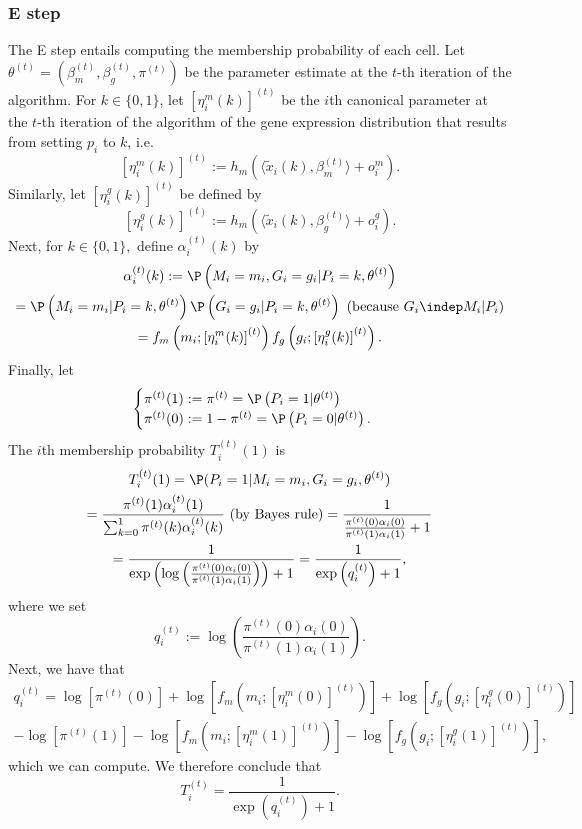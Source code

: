 \documentclass[12pt]{article}
\begin{document}
\begin{appendices}
\subsubsection*{E step}
The E step entails computing the membership probability of each cell. Let $\theta^{(t)} = (\beta_m^{(t)}, \beta_g^{(t)}, \pi^{(t)})$ be the parameter estimate at the $t$-th iteration of the algorithm. For $k \in \{0,1\}$, let $[\eta^m_i(k)]^{(t)}$ be the $i$th canonical parameter at the $t$-th iteration of the algorithm of the gene expression distribution that results from setting $p_i$ to $k$, i.e.
$$
[\eta^m_i(k)]^{(t)} := h_m\left( \langle \tilde{x}_i(k) , \beta_m^{(t)} \rangle + o^m_i \right).
$$ Similarly, let $\left[\eta^g_i(k)\right]^{(t)}$ be defined by
$$\left[\eta^g_i(k)\right]^{(t)} :=  h_m\left( \langle \tilde{x}_i(k) , \beta_g^{(t)} \rangle + o^g_i \right).$$
Next, for $k \in \{0,1\},$ define $\alpha^{(t)}_i(k)$ by
\begin{multline*}
\alpha^{(t)}_i(k) := \P\left( M_i = m_i, G_i = g_i | P_i = k, \theta^{(t)} \right) \\ = \P\left( M_i = m_i | P_i = k, \theta^{(t)} \right) \P\left(G_i = g_i | P_i = k, \theta^{(t)} \right) \textrm{ (because $G_i \indep M_i | P_i$)} \\ = f_m\left(m_i; \left[ \eta^m_i(k) \right]^{(t)}\right) f_g\left(g_i; \left[ \eta^g_i(k) \right]^{(t)} \right).
\end{multline*}
Finally, let 
$$
\begin{cases}
\pi^{(t)}(1) := \pi^{(t)} = \P\left(P_i = 1 | \theta^{(t)} \right) \\
\pi^{(t)}(0) := 1 - \pi^{(t)} = \P\left(P_i = 0 | \theta^{(t)} \right).
\end{cases}
$$
The $i$th membership probability $T^{(t)}_i(1)$ is
\begin{multline*}
T^{(t)}_i(1) = \P(P_i = 1 | M_i = m_i, G_i = g_i, \theta^{(t)}) \\ = \frac{\pi^{(t)}(1) \alpha^{(t)}_i(1)}{ \sum_{k=0}^1 \pi^{(t)}(k) \alpha^{(t)}_i(k)} \textrm{ (by Bayes rule)} = \frac{1}{\frac{ \pi^{(t)}(0) \alpha_i(0)}{\pi^{(t)}(1) \alpha_i(1)} + 1} \\ = \frac{1}{ \exp\left(\log\left(\frac{\pi^{(t)}(0) \alpha_i(0)}{\pi^{(t)}(1) \alpha_i(1)}\right)\right) + 1} = \frac{ 1 }{ \exp\left(q^{(t)}_i\right) + 1},
\end{multline*}
where we set $$q_i^{(t)} := \log\left(\frac{\pi^{(t)}(0) \alpha_i(0)}{\pi^{(t)}(1) \alpha_i(1)}\right).$$
Next, we have that
\begin{multline*}
q^{(t)}_i = \log\left[ \pi^{(t)}(0) \right] + \log\left[ f_m\left(m_i; \left[ \eta^m_i(0) \right]^{(t)}\right) \right] + \log\left[ f_g\left(g_i; \left[ \eta^g_i(0) \right]^{(t)}\right) \right] \\ - \log\left[ \pi^{(t)}(1) \right] - \log\left[ f_m\left(m_i; \left[ \eta^m_i(1) \right]^{(t)}\right) \right] - \log\left[ f_g\left(g_i; \left[ \eta^g_i(1) \right]^{(t)}\right) \right],
\end{multline*}
which we can compute. We therefore conclude that
$$ T_i^{(t)} = \frac{1}{\exp\left(q^{(t)}_i\right) + 1}.$$

\end{appendices}
\end{document}
